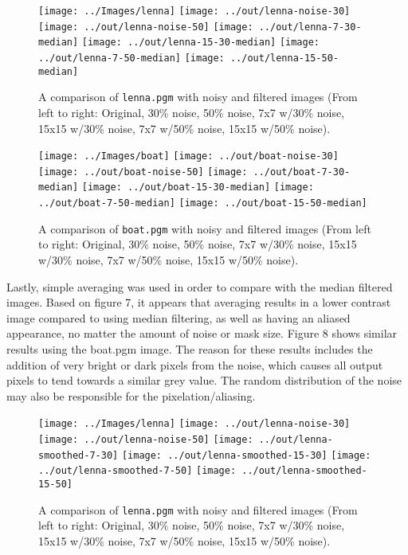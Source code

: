 \documentclass[headings=optiontoheadandtoc,listof=totoc,parskip=full]{scrartcl}
\begin{document}
\begin{figure}[ht]
	\centering
	\texttt{[image: ../Images/lenna]}
	\texttt{[image: ../out/lenna-noise-30]}
	\texttt{[image: ../out/lenna-noise-50]}
	\texttt{[image: ../out/lenna-7-30-median]}
	\texttt{[image: ../out/lenna-15-30-median]}
	\texttt{[image: ../out/lenna-7-50-median]}
	\texttt{[image: ../out/lenna-15-50-median]}
	\caption{A comparison of \texttt{lenna.pgm} with noisy and filtered images (From left to right: Original, 30\% noise, 50\% noise, 7x7 w/30\% noise, 15x15 w/30\% noise, 7x7 w/50\% noise, 15x15 w/50\% noise).}
	\label{fig:median-result-1}
\end{figure}


\begin{figure}[ht]
	\centering
	\texttt{[image: ../Images/boat]}
	\texttt{[image: ../out/boat-noise-30]}
	\texttt{[image: ../out/boat-noise-50]}
	\texttt{[image: ../out/boat-7-30-median]}
	\texttt{[image: ../out/boat-15-30-median]}
	\texttt{[image: ../out/boat-7-50-median]}
	\texttt{[image: ../out/boat-15-50-median]}
	\caption{A comparison of \texttt{boat.pgm} with noisy and filtered images (From left to right: Original, 30\% noise, 50\% noise, 7x7 w/30\% noise, 15x15 w/30\% noise, 7x7 w/50\% noise, 15x15 w/50\% noise).}
	\label{fig:median-result-2}
\end{figure}

Lastly, simple averaging was used in order to compare with the median filtered images. Based on figure 7, it appears that averaging results in a lower contrast image compared to using median filtering, as well as having an aliased appearance, no matter the amount of noise or mask size. Figure 8 shows similar results using the boat.pgm image. The reason for these results includes the addition of very bright or dark pixels from the noise, which causes all output pixels to tend towards a similar grey value. The random distribution of the noise may also be responsible for the pixelation/aliasing. 

\begin{figure}[ht]
	\centering
	\texttt{[image: ../Images/lenna]}
	\texttt{[image: ../out/lenna-noise-30]}
	\texttt{[image: ../out/lenna-noise-50]}
	\texttt{[image: ../out/lenna-smoothed-7-30]}
	\texttt{[image: ../out/lenna-smoothed-15-30]}
	\texttt{[image: ../out/lenna-smoothed-7-50]}
	\texttt{[image: ../out/lenna-smoothed-15-50]}
	\caption{A comparison of \texttt{lenna.pgm} with noisy and filtered images (From left to right: Original, 30\% noise, 50\% noise, 7x7 w/30\% noise, 15x15 w/30\% noise, 7x7 w/50\% noise, 15x15 w/50\% noise).}
	\label{fig:median-result-3}
\end{figure}
\end{document}

